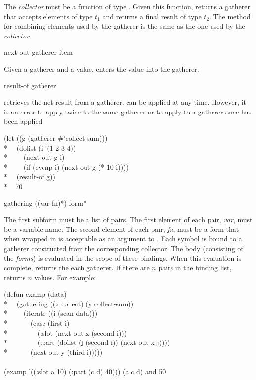 \begin{new}
\begin{defun}[Function]
The {\it collector} must be a function of type 
.  Given this function, 
returns a gatherer that accepts elements of type $t_1$ and returns a final
result of type $t_2$.  The method for combining elements used by the
gatherer is the same as the one used by the {\it collector}.
\end{defun}


\begin{defun}[Function]
next-out gatherer item

Given a gatherer and a value,  enters the value into the
gatherer.
\end{defun}


\begin{defun}[Function]
result-of gatherer

 retrieves the net result from a gatherer.  
can be applied at any time.  However, it is an error to apply 
 twice to the same gatherer or to apply  to a
gatherer once  has been applied.
\begin{lisp}
(let ((g (gatherer \#'collect-sum))) \\*
~~(dolist (i '(1 2 3 4)) \\*
~~~~(next-out g i) \\*
~~~~(if (evenp i) (next-out g (* 10 i)))) \\*
~~(result-of g)) \\*
~{\EV} 70
\end{lisp}
\end{defun}

\begin{defmac}
gathering ({(var fn)}*) {form}*

The first subform must be a list of pairs.  The first
element of each pair, {\it var}, must be a variable name.
The second element of each pair, {\it fn},
must be a form that when wrapped in  is
acceptable as an argument to .  Each symbol is bound to a
gatherer constructed from the corresponding collector.  The body
(consisting of the {\it forms}) is evaluated in the scope of these bindings. 
When this evaluation is complete,  returns the  each
gatherer.  If there are $n$ pairs in the binding list,
 returns $n$ values.  For example:
\begin{lisp}
(defun examp (data) \\*
~~(gathering ((x collect) (y collect-sum)) \\*
~~~~(iterate ((i (scan data))) \\*
~~~~~~(case (first i) \\*
~~~~~~~~(:slot (next-out x (second i))) \\*
~~~~~~~~(:part (dolist (j (second i)) (next-out x j)))) \\*
~~~~~~(next-out y (third i))))) \\
\\
(examp '((:slot a 10) (:part (c d) 40))) {\EV} (a c d) {\rm and} 50
\end{lisp}


\end{defmac}
\end{new}
